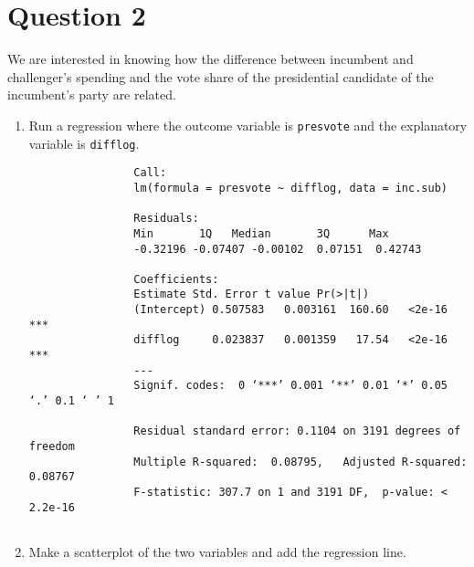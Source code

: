 \documentclass[12pt,letterpaper]{article}
\begin{document}
\vspace{.5cm}

\section*{Question 2}
\noindent We are interested in knowing how the difference between incumbent and challenger's spending and the vote share of the presidential candidate of the incumbent's party are related.	\vspace{.25cm}
	\begin{enumerate}
		\item Run a regression where the outcome variable is \texttt{presvote} and the explanatory variable is \texttt{difflog}.	
		
		\vspace{.15cm}
		 
		\vspace{.15cm}
		\begin{footnotesize}
			
			\begin{verbatim}
				Call:
				lm(formula = presvote ~ difflog, data = inc.sub)
				
				Residuals:
				Min       1Q   Median       3Q      Max 
				-0.32196 -0.07407 -0.00102  0.07151  0.42743 
				
				Coefficients:
				Estimate Std. Error t value Pr(>|t|)    
				(Intercept) 0.507583   0.003161  160.60   <2e-16 ***
				difflog     0.023837   0.001359   17.54   <2e-16 ***
				---
				Signif. codes:  0 ‘***’ 0.001 ‘**’ 0.01 ‘*’ 0.05 ‘.’ 0.1 ‘ ’ 1
				
				Residual standard error: 0.1104 on 3191 degrees of freedom
				Multiple R-squared:  0.08795,	Adjusted R-squared:  0.08767 
				F-statistic: 307.7 on 1 and 3191 DF,  p-value: < 2.2e-16
				
			\end{verbatim}
		\end{footnotesize}
		\vspace{.15cm}
		\item Make a scatterplot of the two variables and add the regression line. 	
		\vspace{.15cm}
		 
		\vspace{.15cm}
		\begin{figure}[h!]\centering
			

\end{figure}
\end{enumerate}
\end{document}
